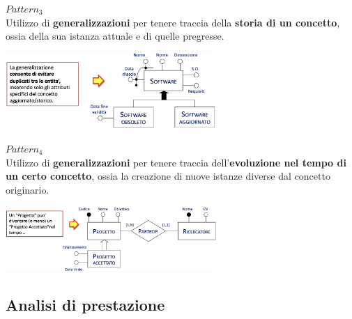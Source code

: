 \documentclass{article}
\begin{document}
\textit{$Pattern_3$}\\
Utilizzo di \textbf{generalizzazioni} per tenere traccia della \textbf{storia di un concetto}, ossia della sua istanza attuale e di quelle pregresse.
\begin{center}
    \includegraphics[width=0.6\textwidth]{foto 6.png}
\end{center}
\textit{$Pattern_4$}\\
Utilizzo di \textbf{generalizzazioni} per tenere traccia dell'\textbf{evoluzione nel tempo di un certo concetto}, ossia la creazione di nuove istanze diverse dal concetto originario.
\begin{center}
    \includegraphics[width=0.6\textwidth]{foto 7.png}
\end{center}

\subsection*{Analisi di prestazione}
\large
\end{document}
